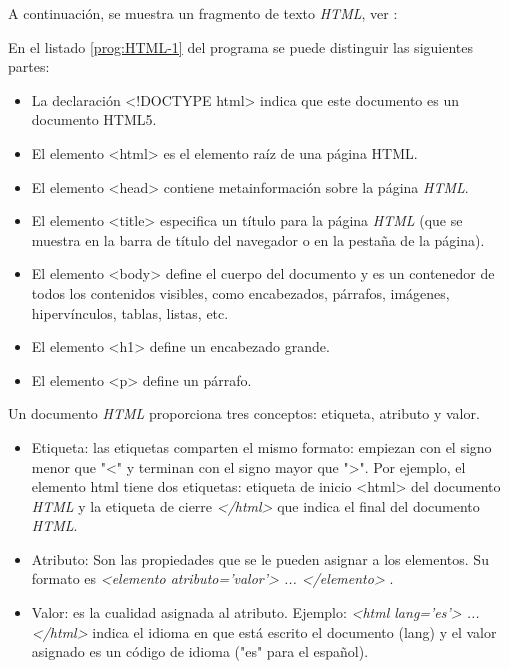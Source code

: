 
A continuación, se muestra un fragmento  de texto \textit{HTML}, ver :

      \label{prog:HTML-1}


En el listado \ref{prog:HTML-1} del programa se puede distinguir las siguientes partes:
\begin{itemize}
	\item  La declaración <!DOCTYPE html> indica que este documento es un documento HTML5.
	\item El elemento <html> es el elemento raíz de una página HTML.
	\item El elemento <head> contiene metainformación sobre la página \textit{HTML}.
	\item El elemento <title> especifica un título para la página \textit{HTML} (que se muestra en la barra de título del navegador o en la pestaña de la página).
	\item El elemento <body> define el cuerpo del documento y es un contenedor de todos los contenidos visibles, como encabezados, párrafos, imágenes, hipervínculos, tablas, listas, etc.
	\item El elemento <h1> define un encabezado grande.
	\item El elemento <p> define un párrafo.
\end{itemize}

Un documento \textit{HTML} proporciona tres conceptos: etiqueta, atributo y valor.

\begin{itemize}
	\item Etiqueta: las etiquetas comparten el mismo formato: empiezan con el signo menor que "<" y terminan con el signo mayor que ">". 	Por ejemplo, el elemento html tiene dos etiquetas: etiqueta de inicio <html>   del documento \textit{HTML} y la etiqueta de cierre \textit{</html>} que indica el final del documento \textit{HTML}.
	
	\item Atributo: Son las propiedades que se le pueden asignar a los elementos. Su formato es  \textit{<elemento atributo='valor'> ... </elemento> }.
	\item Valor: es la cualidad asignada al atributo. Ejemplo:  \textit{<html lang='es'> ... </html>} indica el idioma en que está escrito el documento (lang) y el valor asignado es un código de idioma ("es" para el español).
\end{itemize}

